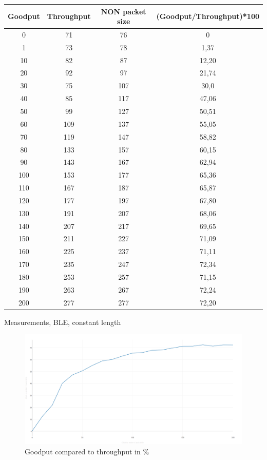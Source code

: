 \begin{center}
 \begin{tabular}{||c c c c||} 
 \hline
 Goodput & Throughput & NON packet size & (Goodput/Throughput)*100 \\ [0.5ex] 
 \hline\hline
 0 & 71 & 76 & 0 \\ 
 \hline
 1 & 73 & 78 & 1,37 \\
 \hline
 10 & 82 & 87 & 12,20 \\
 \hline
 20 & 92 & 97 & 21,74 \\
  \hline
 30 & 75 & 107 & 30,0 \\
  \hline
 40 & 85 & 117 & 47,06 \\
  \hline
 50 & 99 & 127 & 50,51 \\
  \hline
 60 & 109 & 137 & 55,05 \\
  \hline
 70 & 119 & 147 & 58,82 \\
  \hline
 80 & 133 & 157 & 60,15 \\
  \hline
 90 & 143 & 167 & 62,94 \\
 \hline
 100 & 153 & 177 & 65,36 \\
 \hline
 110 & 167 & 187 & 65,87 \\
 \hline
 120 & 177 & 197 & 67,80 \\
 \hline
 130 & 191 & 207 & 68,06 \\
 \hline
 140 & 207 & 217 & 69,65 \\
 \hline
 150 & 211 & 227 & 71,09 \\
 \hline
 160 & 225 & 237 & 71,11 \\
 \hline
 170 & 235 & 247 & 72,34 \\
 \hline
 180 & 253 & 257 & 71,15 \\
 \hline
 190 & 263 & 267 & 72,24 \\
 \hline
 200 & 277 & 277 & 72,20 \\ [1ex] 
 \hline
\end{tabular}
\caption{Measurements, BLE, constant length}
\label{table:1}
\end{center}



\begin{figure}[ht]
    \centering
    \includegraphics[scale=0.25]{graph1.png}    
    \caption{Goodput compared to throughput in \%}
    \label{fig:goodputThroughputGraph}
\end{figure}



